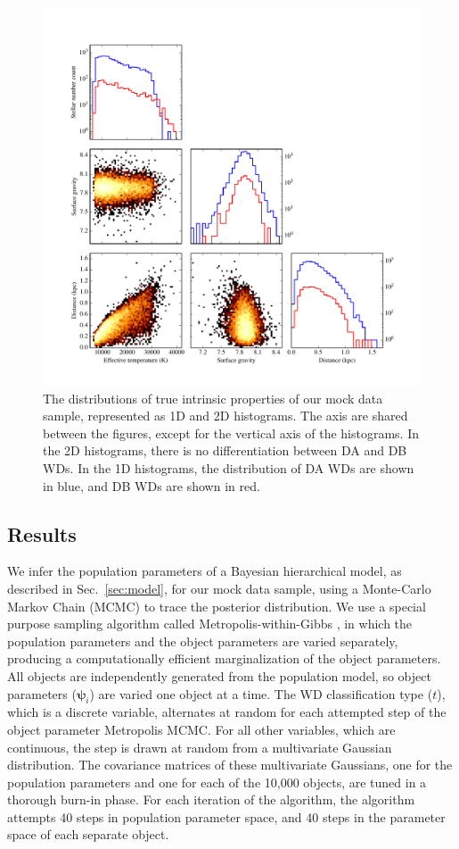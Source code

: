 \documentclass[fleqn,usenatbib]{mnras}
\newcommand{\objp}{\boldsymbol{\psi}}
\begin{document}
\begin{figure}
	\includegraphics[width=.9\textwidth]{10000WDs.pdf}
    \caption{The distributions of true intrinsic properties of our mock data sample, represented as 1D and 2D histograms. The axis are shared between the figures, except for the vertical axis of the histograms. In the 2D histograms, there is no differentiation between DA and DB WDs. In the 1D histograms, the distribution of DA WDs are shown in blue, and DB WDs are shown in red.}
    \label{fig:10000WDs}
\end{figure}



\subsection{Results}

We infer the population parameters of a Bayesian hierarchical model, as described in Sec.~\ref{sec:model}, for our mock data sample, using a Monte-Carlo Markov Chain (MCMC) to trace the posterior distribution. We use a special purpose sampling algorithm called Metropolis-within-Gibbs \citep{BayesianDataAnalysis}, in which the population parameters and the object parameters are varied separately, producing a computationally efficient marginalization of the object parameters. All objects are independently generated from the population model, so object parameters ($\objp_i$) are varied one object at a time. The WD classification type ($t$), which is a discrete variable, alternates at random for each attempted step of the object parameter Metropolis MCMC. For all other variables, which are continuous, the step is drawn at random from a multivariate Gaussian distribution. The covariance matrices of these multivariate Gaussians, one for the population parameters and one for each of the 10,000 objects, are tuned in a thorough burn-in phase. For each iteration of the algorithm, the algorithm attempts 40 steps in population parameter space, and 40 steps in the parameter space of each separate object.
\end{document}
